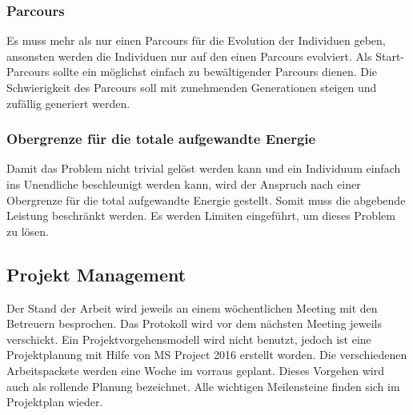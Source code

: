     \subsubsection{Parcours}

      Es muss mehr als nur einen Parcours für die Evolution der Individuen geben,
      ansonsten werden die Individuen nur auf den einen Parcours evolviert.
      Als Start-Parcours sollte ein möglichst einfach zu bewältigender Parcours dienen.
      Die Schwierigkeit des Parcours soll mit zunehmenden Generationen steigen und zufällig generiert werden.

    \subsubsection{Obergrenze für die totale aufgewandte Energie}

      Damit das Problem nicht trivial gelöst werden kann
      und ein Individuum einfach ins Unendliche beschleunigt werden kann,
      wird der Anspruch nach einer Obergrenze für die total aufgewandte Energie gestellt.
      Somit muss die abgebende Leistung beschränkt werden. Es werden Limiten eingeführt,
      um dieses Problem zu lösen.

    \subsection{Projekt Management}
      Der Stand der Arbeit wird jeweils an einem wöchentlichen Meeting mit den Betreuern besprochen.
      Das Protokoll wird vor dem nächsten Meeting jeweils verschickt.
      Ein Projektvorgehensmodell wird nicht benutzt, jedoch ist eine Projektplanung mit Hilfe von MS Project 2016
      erstellt worden. Die verschiedenen Arbeitspackete werden eine Woche im vorraus geplant.
      Dieses Vorgehen wird auch als rollende Planung bezeichnet. Alle wichtigen Meilensteine finden sich im Projektplan wieder.
